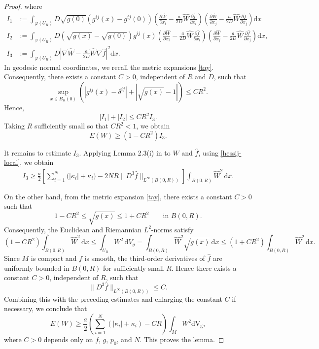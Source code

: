 \documentclass[12pt,reqno]{amsart}
\newcommand{\V}{\mathrm{d} \mathrm{V_g}}
\numberwithin{equation}{section}
\begin{document}
\begin{proof}
where
\begin{align*}
I_1 &:=
 \int_{\varphi(U_R)} D \sqrt{g(0)}  (g^{i j} (x) - g^{i j} (0)) 
  \left( \frac{\partial \hat{W}}{\partial x_i} - \frac{a}{2D} \hat{W} \frac{\partial
  \hat{f}}{\partial x_i} \right)  \left( \frac{\partial \hat{W}}{\partial x_j} -  \frac{a}{2D} \hat{W} \frac{\partial \hat{f}}{\partial x_j} \right)  \mathrm{d} x \nonumber\\
I_2 &:=
\int_{\varphi(U_R)} D \left( \sqrt{g(x)}  - \sqrt{g(0)}  \right) g^{i j} (x) \left( \frac{\partial \hat{W}}{\partial x_i} -
\frac{a}{2D} \hat{W} \frac{\partial \hat{f}}{\partial x_i} \right) 
\left(\frac{\partial \hat{W}}{\partial x_j} - \frac{a}{2D} \hat{W}\frac{\partial\hat{f}}{\partial x_j} \right)  \mathrm{d} x \nonumber,\\
I_3 &:=
\int_{\varphi(U_R)} D  \left| \nabla \hat{W} - \frac{a}{2D} \hat{W} \nabla \hat{f}   \right|^2 \mathrm{d} x  .
\end{align*}
In geodesic normal coordinates, we recall the metric expansions \eqref{tay}. Consequently, there exists a constant \(C>0\), independent of \(R\) and \(D\), such that
\[
\sup_{x\in B_R(0)}
\left( |g^{ij}(x)-\delta^{ij}| + |\sqrt{ g(x)}-1| \right) \le C R^2.
\]
Hence,
\[
|I_1| + |I_2| \le C R^2 I_3.
\]
Taking \(R\) sufficiently small so that \(CR^2<1\), we obtain
\[
E(W) \ge (1 - C R^2) I_3.
\]

It remains to estimate \(I_3\). Applying Lemma 2.3(i) in \cite{PZZ19} to \(\hat W\) and \(\hat f\), using \eqref{hessij-local}, we obtain
\begin{align}
    I_3\geq
    \frac{a}{2}
    \left[
        \sum_{i=1}^N\bigl(|\kappa_i|+\kappa_i\bigr)
        -
        2NR
        \|D^3\hat f\|_{L^\infty(B(0,R))}
    \right]
    \int_{B(0,R)}\hat W^2\,\mathrm dx.
    \label{I3}
\end{align}

On the other hand, from the metric expansion \eqref{tay}, there exists a constant \(C>0\) such that
\[
    1-CR^2
    \leq
    \sqrt{g(x)}
    \leq
    1+CR^2
    \qquad
    \text{in }B(0,R).
\]
Consequently, the Euclidean and Riemannian \(L^2\)-norms satisfy
\[
    (1-CR^2)
\int_{B(0,R)}\hat W^2\,\mathrm dx
    \leq\!
\int_{U_R}W^2\,\mathrm dV_g
=\! \int_{B(0,R)}\hat{W}^2\sqrt{g(x)}\,\mathrm dx
    \leq
    (1+CR^2) \!   \int_{B(0,R)}\hat W^2\,\mathrm dx.
\]
Since \(M\) is compact and \(f\) is smooth, the third-order derivatives of \(\hat f\) are uniformly bounded in \(B(0,R)\) for sufficiently small \(R\). Hence there exists a constant \(C>0\), independent of \(R\), such that
\[
\|D^3\hat f\|_{L^\infty(B(0,R))} \le C.
\]Combining this with the preceding estimates and enlarging the constant \(C\) if necessary, we conclude that
\begin{equation}\label{eq:manifold-local-lower-bound}
E(W)
\geq
\frac{a}{2}
\left(
\sum_{i=1}^N (|\kappa_i|+\kappa_i)
-
CR
\right)
\int_M W^2 \V,
\end{equation}
where \(C>0\) depends only on \(f\), \(g\), \(p_0\), and \(N\). This proves the lemma.
\end{proof}
\end{document}
